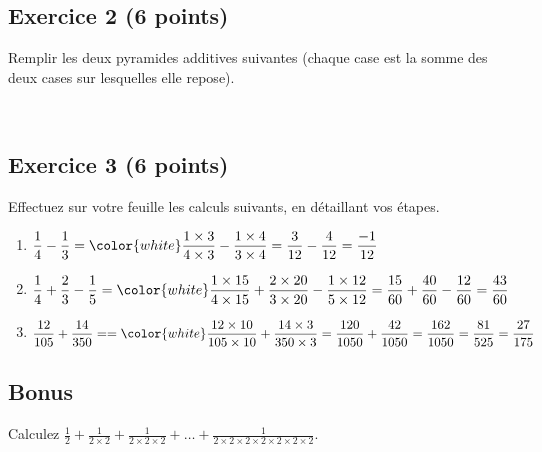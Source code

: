 \documentclass[14 pt]{extarticle}
\theoremstyle{plain}
\begin{document}
 \subsection*{Exercice 2 (6 points)}
 Remplir les deux pyramides additives suivantes (chaque case est la somme des deux cases sur lesquelles elle repose). 


\begin{figure}[H]
\center
{}\ 
\end{figure}


\subsection*{Exercice 3 (6 points)}

Effectuez sur votre feuille les calculs suivants, en détaillant vos étapes. 

\begin{enumerate}
\item $\displaystyle \frac14 - \frac13 = \color{white} \frac{1\times3}{4\times3} - \frac{1\times4}{3\times 4} = \frac3{12}-\frac4{12} = \frac{-1}{12}$  

\item $\displaystyle \frac14 + \frac23 - \frac15 = \color{white} \frac{1\times15}{4\times15} + \frac{2\times20}{3\times 20}- \frac{1\times 12}{5\times12} = \frac{15}{60} + \frac{40}{60} - \frac{12}{60} = \frac{43}{60}$   

\item $\displaystyle \frac{12}{105} + \frac{14}{350} = = \color{white} 
\frac{12\times 10}{105\times 10} + \frac{14\times 3}{350\times3} = \frac{120}{1050} + \frac{42}{1050} = \frac{162}{1050} = \frac{81}{525} = \frac{27}{175}$ 
\end{enumerate}

\subsection*{Bonus}
Calculez $\displaystyle \frac12 + \frac1{2 \times 2} + \frac1{2\times 2 \times 2} + \ldots + \frac1{2\times 2\times 2 \times 2 \times 2 \times 2 \times 2}$.
 	
\end{document}

